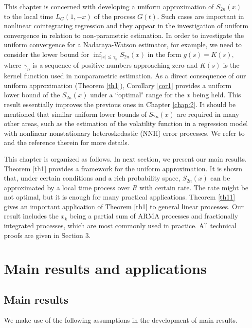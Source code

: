 This chapter is concerned with developing a uniform approximation of $S_{2n}(x)$ to the local time $L_{G}(1,-x)$ of the process $G(t)$. Such cases are important in nonlinear cointegrating regression and they appear in the investigation  of   uniform convergence in relation to  non-parametric estimation.  In order to investigate the uniform convergence for a Nadaraya-Watson estimator, for example, we need to consider the lower bound for $\inf _{|x|\le \gamma_n}S_{2n}(x)$ in
the form $g( s) =K( s),$ where $\gamma_n$ is a sequence of positive numbers approaching zero and $K(s) $ is the kernel function used in nonparametric estimation. As  a direct consequence of our uniform approximation  (Theorem \ref{th1}), Corollary \ref{cor1} provides a uniform lower  bound of the $S_{2n}(x)$ under  a ``optimal" range for the $x$ being held. This result essentially improves the previous ones in Chapter \ref{chap:2}. It should be mentioned that similar  uniform lower bounds of $S_{2n}(x)$  are required in many other areas, such as  the estimation of the volatility function in a regression  model with nonlinear nonstationary heteroskedastic (NNH) error processes. We refer to \cite{wangwang2012} and the reference therein  for more details.

This chapter is organized as follows.  In next section, we present our
main results. Theorem \ref {th1} provides a framework for the uniform approximation. It is shown that, under certain conditions and a rich probability space, $S_{2n}(x)$ can be approximated by a local time process over $R$ with certain rate. The rate might be not optimal, but it is enough for many practical applications.
Theorem \ref {th11} gives an important application of
Theorem \ref {th1} to general linear processes. Our result includes
 the $x_k$ being a partial sum of ARMA processes and fractionally integrated processes,
 which are most commonly used in practice. All technical proofs are given in Section 3.



\section{Main results and applications}
\subsection{Main results}

We make use of the following assumptions in the development of main results.

